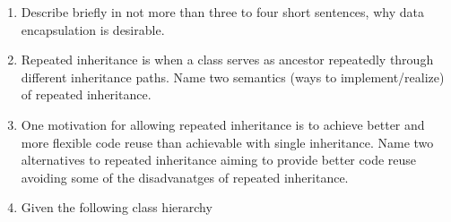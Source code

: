 \documentclass{article}
\begin{document}
\begin{enumerate}
\item Describe briefly in not more than three to four short sentences,
  why data encapsulation is desirable.
\item Repeated inheritance is when a class serves as ancestor
  repeatedly through different inheritance paths. Name two semantics
  (ways to implement/realize) of repeated inheritance. 
\item One motivation for allowing repeated inheritance is to achieve
  better and more flexible code reuse than achievable with single
  inheritance. Name two alternatives to repeated inheritance aiming to
  provide better code reuse avoiding some of the disadvanatges of
  repeated inheritance. 
\item Given the following class
  hierarchy \\
\begin{center}

\end{center}
\end{enumerate}
\end{document}
